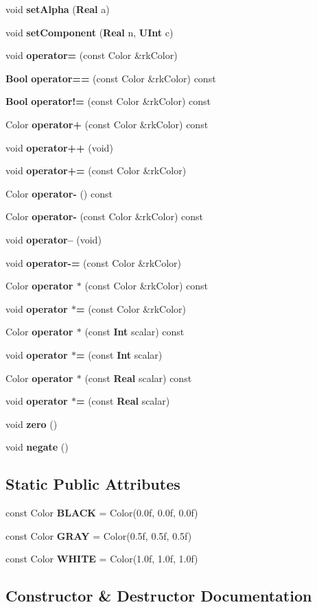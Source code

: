 \begin{CompactItemize}
void {\bf set\-Alpha} ({\bf Real} a)
\item 
void {\bf set\-Component} ({\bf Real} n, {\bf UInt} c)
\item 
void {\bf operator=} (const Color \&rk\-Color)
\item 
{\bf Bool} {\bf operator==} (const Color \&rk\-Color) const
\item 
{\bf Bool} {\bf operator!=} (const Color \&rk\-Color) const
\item 
Color {\bf operator+} (const Color \&rk\-Color) const
\item 
void {\bf operator++} (void)
\item 
void {\bf operator+=} (const Color \&rk\-Color)
\item 
Color {\bf operator-} () const
\item 
Color {\bf operator-} (const Color \&rk\-Color) const
\item 
void {\bf operator--} (void)
\item 
void {\bf operator-=} (const Color \&rk\-Color)
\item 
Color {\bf operator $\ast$} (const Color \&rk\-Color) const
\item 
void {\bf operator $\ast$=} (const Color \&rk\-Color)
\item 
Color {\bf operator $\ast$} (const {\bf Int} scalar) const
\item 
void {\bf operator $\ast$=} (const {\bf Int} scalar)
\item 
Color {\bf operator $\ast$} (const {\bf Real} scalar) const
\item 
void {\bf operator $\ast$=} (const {\bf Real} scalar)
\item 
void {\bf zero} ()
\item 
void {\bf negate} ()
\end{CompactItemize}
\subsection*{Static Public Attributes}
\begin{CompactItemize}
\item 
const Color {\bf BLACK} = Color(0.0f, 0.0f, 0.0f)
\item 
const Color {\bf GRAY} = Color(0.5f, 0.5f, 0.5f)
\item 
const Color {\bf WHITE} = Color(1.0f, 1.0f, 1.0f)
\end{CompactItemize}


\subsection{Constructor \& Destructor Documentation}
